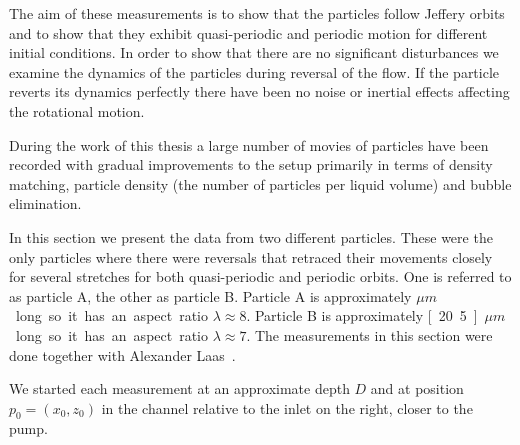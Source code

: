 \label{chap:results}
The aim of these measurements is to show that the particles follow Jeffery orbits and to show that they exhibit quasi-periodic and periodic motion for different initial conditions. In order to show that there are no significant disturbances we examine the dynamics of the particles during reversal of the flow. If the particle reverts its dynamics perfectly there have been no noise or inertial effects affecting the rotational motion.

During the work of this thesis a large number of movies of particles have been recorded with gradual improvements to the setup primarily in terms of density matching, particle density (the number of particles per liquid volume) and  bubble elimination. 

In this section we present the data from two different particles. These were the only particles where there were reversals that retraced their movements closely for several stretches for both quasi-periodic and periodic orbits. One is referred to as particle A, the other as particle B. Particle A is approximately \unit[24]{$\mu m$} long so it has an aspect ratio $\lambda \approx 8$. Particle B is approximately \unit[20.5]{$\mu m$} long so it has an aspect ratio $\lambda \approx 7$. The measurements in this section were done together with Alexander Laas~\cite{alexanderThesis}.

We started each measurement at an approximate depth $D$ and at position $p_0 = (x_0, z_0)$ in the channel relative to the inlet on the right, closer to the pump. 

\newpage